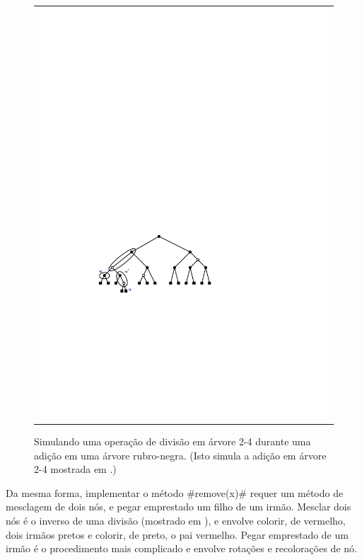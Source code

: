 \begin{figure}
\begin{center}
\begin{tabular}{c}
			\includegraphics[scale=0.90909]{figs/rb-split-3} \\
		\end{tabular}
	\end{center}
	\caption[Simulando uma árvore 2-4] {Simulando uma operação de divisão em árvore 2-4
		durante uma adição em uma árvore rubro-negra. (Isto simula a adição em
		árvore 2-4 mostrada em .)}
\end{figure}

Da mesma forma, implementar o método #remove(x)# requer um método de mesclagem 
de dois nós, e pegar emprestado um filho de um irmão. Mesclar dois nós é o inverso de
uma divisão (mostrado em ), e envolve colorir, de vermelho, dois
irmãos pretos e colorir, de preto, o pai vermelho. Pegar emprestado de
um irmão é o procedimento mais complicado e envolve
rotações e recolorações de nó.

